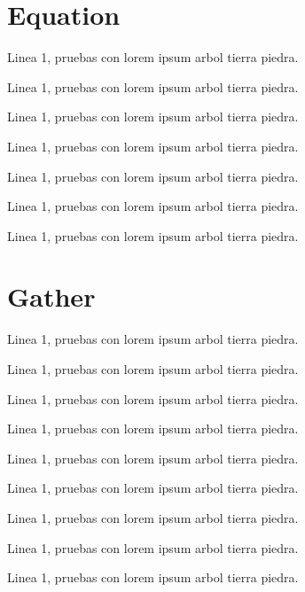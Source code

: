 \newpage
\section{Equation}
Linea 1, pruebas con lorem ipsum arbol tierra piedra.


Linea 1, pruebas con lorem ipsum arbol tierra piedra.


Linea 1, pruebas con lorem ipsum arbol tierra piedra.


Linea 1, pruebas con lorem ipsum arbol tierra piedra.


Linea 1, pruebas con lorem ipsum arbol tierra piedra.


Linea 1, pruebas con lorem ipsum arbol tierra piedra.


Linea 1, pruebas con lorem ipsum arbol tierra piedra.

\newpage
\section{Gather}

Linea 1, pruebas con lorem ipsum arbol tierra piedra.


Linea 1, pruebas con lorem ipsum arbol tierra piedra.


Linea 1, pruebas con lorem ipsum arbol tierra piedra.

\insertgather[\label{gather1}]{arg2}

Linea 1, pruebas con lorem ipsum arbol tierra piedra.


Linea 1, pruebas con lorem ipsum arbol tierra piedra.


Linea 1, pruebas con lorem ipsum arbol tierra piedra.


Linea 1, pruebas con lorem ipsum arbol tierra piedra.

\insertgathercaptioned[\label{gathe3}]{arg2}{}

Linea 1, pruebas con lorem ipsum arbol tierra piedra.


Linea 1, pruebas con lorem ipsum arbol tierra piedra.

\newpage